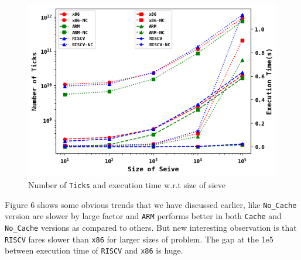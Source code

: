 \begin{figure}[H]
    \centering
    \includegraphics[width=1.0\textwidth]{./figs/6.png}
    \caption{Number of \texttt{Ticks} and execution time w.r.t size of sieve}
    \label{fig:Number of \texttt{Ticks} and execution time w.r.t size of sieve}
\end{figure}
Figure 6 shows some obvious trends that we have discussed earlier, like \texttt{No\_Cache} version are 
slower by large factor and \texttt{ARM} performs better in both \texttt{Cache} and \texttt{No\_Cache} versions
as compared to others. But new interesting observation is that \texttt{RISCV} fares slower than \texttt{x86}
for larger sizes of problem. The gap at the 1e5 between execution time of \texttt{RISCV} and \texttt{x86}
is huge.\\


